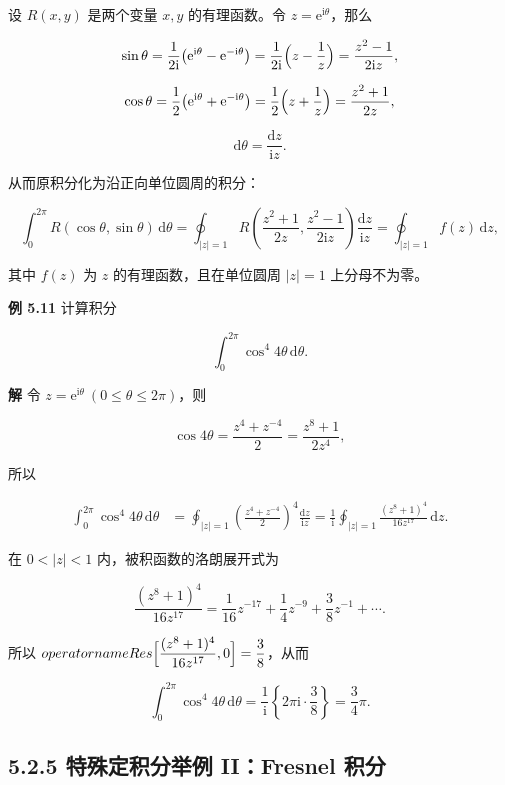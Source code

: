 设 \(R(x,y)\) 是两个变量 \(x,y\) 的有理函数。令
\(z=\mathrm e^{\mathrm i\theta}\)，那么

\[
\sin\theta=\frac{1}{2\mathrm i}\bigl(\mathrm e^{\mathrm i\theta}-\mathrm e^{-\mathrm i\theta}\bigr)
=\frac{1}{2\mathrm i}\Bigl(z-\frac{1}{z}\Bigr)
=\frac{z^{2}-1}{2\mathrm i z},
\]

\[
\cos\theta=\frac{1}{2}\bigl(\mathrm e^{\mathrm i\theta}+\mathrm e^{-\mathrm i\theta}\bigr)
=\frac{1}{2}\Bigl(z+\frac{1}{z}\Bigr)
=\frac{z^{2}+1}{2z},
\]

\[
\mathrm d\theta=\frac{\mathrm dz}{\mathrm i z}.
\]

从而原积分化为沿正向单位圆周的积分：

\[
\int_{0}^{2\pi}R(\cos\theta,\sin\theta)\,\mathrm d\theta
=\oint_{|z|=1}R\left(\frac{z^{2}+1}{2z},\frac{z^{2}-1}{2\mathrm i z}\right)\frac{\mathrm dz}{\mathrm i z}
=\oint_{|z|=1}f(z)\,\mathrm dz,
\]

其中 \(f(z)\) 为 \(z\) 的有理函数，且在单位圆周 \(|z|=1\) 上分母不为零。

\textbf{例 5.11} 计算积分

\[
\int_{0}^{2\pi}\cos^{4}4\theta\,\mathrm d\theta .
\]

\textbf{解} 令
\(z=\mathrm e^{\mathrm i\theta}\ (0\le\theta\le2\pi)\)，则

\[
\cos4\theta=\frac{z^{4}+z^{-4}}{2}=\frac{z^{8}+1}{2z^{4}},
\]

所以

\[
\begin{aligned}
\int_{0}^{2\pi}\cos^{4}4\theta\,\mathrm d\theta
&=\oint_{|z|=1}\left(\frac{z^{4}+z^{-4}}{2}\right)^{4}\frac{\mathrm dz}{\mathrm i z}
=\frac{1}{\mathrm i}\oint_{|z|=1}\frac{(z^{8}+1)^{4}}{16z^{17}}\,\mathrm dz .
\end{aligned}
\]

在 \(0<|z|<1\) 内，被积函数的洛朗展开式为

\[
\frac{(z^{8}+1)^{4}}{16z^{17}}
=\frac{1}{16}z^{-17}+\frac{1}{4}z^{-9}+\frac{3}{8}z^{-1}+\cdots.
\]

所以
\(operatorname{Res}\Bigl[\dfrac{(z^{8}+1)^{4}}{16z^{17}},0\Bigr]=\dfrac38\)，从而

\[
\int_{0}^{2\pi}\cos^{4}4\theta\,\mathrm d\theta
=\frac{1}{\mathrm i}\left\{2\pi\mathrm i\cdot\frac{3}{8}\right\}
=\frac{3}{4}\pi .
\]

\subsection{5.2.5 特殊定积分举例 II：Fresnel
积分}\label{ux7279ux6b8aux5b9aux79efux5206ux4e3eux4f8b-iifresnel-ux79efux5206}

